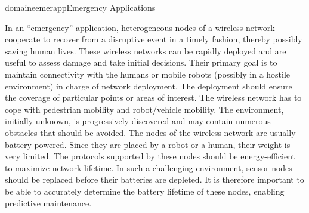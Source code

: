 \documentclass{ra2016}
\begin{document}
\begin{module}{domaine}{emerapp}{Emergency Applications}

In an ``emergency'' application, heterogeneous nodes of a wireless network cooperate to recover from a disruptive event in a timely fashion, thereby possibly saving human lives.
These wireless networks can be rapidly deployed and are useful to assess damage and take initial decisions.
Their primary goal is to maintain connectivity with the humans or mobile robots (possibly in a hostile environment) in charge of network deployment. 
The deployment should ensure the coverage of particular points or areas of interest.
The wireless network has to cope with pedestrian mobility and robot/vehicle mobility.
The environment, initially unknown, is progressively discovered and may contain numerous obstacles that should be avoided.
The nodes of the wireless network are usually battery-powered.
Since they are placed by a robot or a human, their weight is very limited.
The protocols supported by these nodes should be energy-efficient to maximize network lifetime.
In such a challenging environment, sensor nodes should be replaced before their batteries are depleted.
It is therefore important to be able to accurately determine the battery lifetime of these nodes, enabling predictive maintenance.

\end{module}


\end{document}
